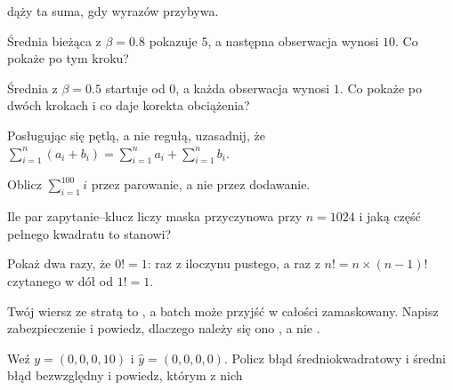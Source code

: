 \begin{testexercises}
  dąży ta suma, gdy wyrazów przybywa.
\item Średnia bieżąca z $\beta = \num{0.8}$ pokazuje $5$, a następna
  obserwacja wynosi $10$. Co pokaże po tym kroku?
\item Średnia z $\beta = \num{0.5}$ startuje od $0$, a każda obserwacja wynosi
  $1$. Co pokaże po dwóch krokach i co daje korekta obciążenia?
\end{testexercises}

\begin{furtherproblems}
\item Posługując się pętlą, a nie regułą, uzasadnij, że
  $\sum_{i=1}^{n}(a_i + b_i) = \sum_{i=1}^{n} a_i + \sum_{i=1}^{n} b_i$.
\item Oblicz $\sum_{i=1}^{100} i$ przez parowanie, a nie przez dodawanie.
\item Ile par zapytanie--klucz liczy maska przyczynowa przy $n = 1024$ i jaką
  część pełnego kwadratu to stanowi?
\item Pokaż dwa razy, że $0! = 1$: raz z iloczynu pustego, a raz z
  $n! = n \times (n-1)!$ czytanego w dół od $1! = 1$.
\item Twój wiersz ze stratą to , a batch może przyjść w
  całości zamaskowany. Napisz zabezpieczenie i powiedz, dlaczego należy się
  ono , a nie .
\item Weź $y = (0, 0, 0, 10)$ i $\hat{y} = (0, 0, 0, 0)$. Policz błąd
  średniokwadratowy i średni błąd bezwzględny i powiedz, którym z nich

\end{furtherproblems}
